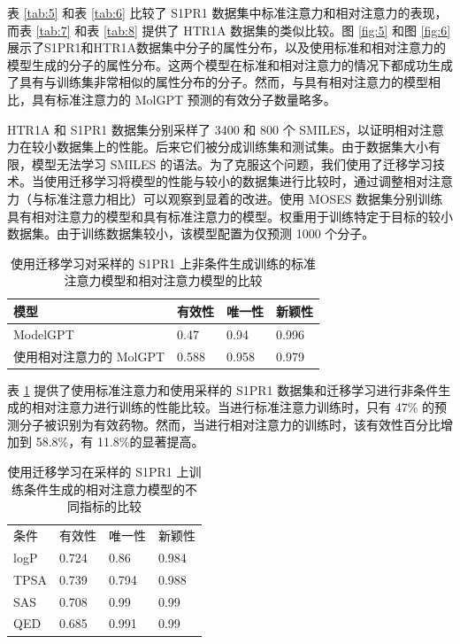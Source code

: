 \begin{translation}
表 \ref{tab:5} 和表 \ref{tab:6} 比较了 S1PR1 数据集中标准注意力和相对注意力的表现，而表 \ref{tab:7} 和表 \ref{tab:8} 提供了 HTR1A 数据集的类似比较。图 \ref{fig:5} 和图 \ref{fig:6} 展示了S1PR1和HTR1A数据集中分子的属性分布，以及使用标准和相对注意力的模型生成的分子的属性分布。这两个模型在标准和相对注意力的情况下都成功生成了具有与训练集非常相似的属性分布的分子。然而，与具有相对注意力的模型相比，具有标准注意力的 MolGPT 预测的有效分子数量略多。

HTR1A 和 S1PR1 数据集分别采样了 3400 和 800 个 SMILES，以证明相对注意力在较小数据集上的性能。后来它们被分成训练集和测试集。由于数据集大小有限，模型无法学习 SMILES 的语法。为了克服这个问题，我们使用了迁移学习技术。当使用迁移学习将模型的性能与较小的数据集进行比较时，通过调整相对注意力（与标准注意力相比）可以观察到显着的改进。使用 MOSES 数据集分别训练具有相对注意力的模型和具有标准注意力的模型。权重用于训练特定于目标的较小数据集。由于训练数据集较小，该模型配置为仅预测 1000 个分子。

\begin{table}[H]
  \centering
  \caption{使用迁移学习对采样的 S1PR1 上非条件生成训练的标准注意力模型和相对注意力模型的比较}
  \label{tab:9}
  \begin{tabular}{llll}
    \hline 模型       & 有效性   & 唯一性   & 新颖性   \\
    \hline ModelGPT & 0.47  & 0.94  & 0.996 \\
    使用相对注意力的 MolGPT & 0.588 & 0.958 & 0.979 \\
    \hline
  \end{tabular}
\end{table}

表 \ref{tab:9} 提供了使用标准注意力和使用采样的 S1PR1 数据集和迁移学习进行非条件生成的相对注意力进行训练的性能比较。当进行标准注意力训练时，只有 47\% 的预测分子被识别为有效药物。然而，当进行相对注意力的训练时，该有效性百分比增加到 58.8\%，有 11.8\%的显著提高。

\begin{table}[H]
  \centering
  \caption{使用迁移学习在采样的 S1PR1 上训练条件生成的相对注意力模型的不同指标的比较}
  \label{tab:10}
  \begin{tabular}{llll}
    \hline 条件 & 有效性   & 唯一性   & 新颖性   \\
    logP      & 0.724 & 0.86  & 0.984 \\
    TPSA      & 0.739 & 0.794 & 0.988 \\
    SAS       & 0.708 & 0.99  & 0.99  \\
    QED       & 0.685 & 0.991 & 0.99  \\
    \hline
  \end{tabular}
\end{table}



\end{translation}

